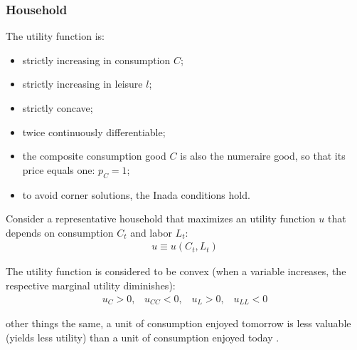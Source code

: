 \documentclass[
thesis.tex
]{subfiles}
\begin{document}
\subsubsection{Household}


\begin{definition}
	{\singlespacing
		The utility function is:
		\begin{itemize}
			\item strictly increasing in consumption $C$;
			\item strictly increasing in leisure $l$;
			\item strictly concave;
			\item twice continuously differentiable;
			\item the composite consumption good $C$ is also the numeraire good, so that its price equals one: $p_C=1$;
			\item to avoid corner solutions, the Inada conditions\footnotemark{} hold. 
	\end{itemize}}
	
	Consider a representative household that maximizes an utility function $u$ that depends on consumption $C_t$ and labor $L_t$:
	\begin{align}
		u \equiv u \left( C_t, L_t \right)
	\end{align}
	
	The utility function is considered to be convex (when a variable increases, the respective marginal utility diminishes)\footnotemark{}: 
	\begin{align*}
		u_{C} > 0 \text{,}\quad u_{CC} < 0 \text{,}\quad
		u_{L} > 0 \text{,}\quad u_{LL} < 0
	\end{align*}
	
\end{definition}

\begin{definition}
	other things the same, a unit of consumption enjoyed tomorrow is less valuable (yields less utility) than a unit of consumption enjoyed today \cite[Lecture 2, p.1]{solis-garcia_ucb_2022}.
\end{definition}
\end{document}

